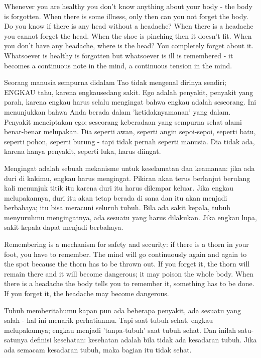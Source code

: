 \english
Whenever you are healthy you don't know anything about your body - the body is forgotten. When there is some illness, only then can you not forget the body. Do you know if there is any head without a headache? When there is a headache you cannot forget the head. When the shoe is pinching then it doesn’t fit. When you don’t have any headache, where is the head? You completely forget about it. Whatsoever is healthy is forgotten but whatsoever is ill is remembered - it becomes a continuous note in the mind, a continuous tension in the mind.

\bahasa
Seorang manusia sempurna didalam Tao tidak mengenal dirinya sendiri; ENGKAU tahu, karena engkausedang sakit. Ego adalah penyakit, penyakit yang parah, karena engkau harus selalu mengingat bahwa engkau adalah seseorang. Ini menunjukkan bahwa Anda berada dalam 'ketidaknyamanan' yang dalam. Penyakit menciptakan ego; seseorang keberadaan yang sempurna sehat alami benar-benar melupakan. Dia seperti awan, seperti angin sepoi-sepoi, seperti batu, seperti pohon, seperti burung - tapi tidak pernah seperti manusia. Dia tidak ada, karena hanya penyakit, seperti luka, harus diingat.

\bahasa
Mengingat adalah sebuah mekanisme untuk keselamatan dan keamanan: jika ada duri di kakimu, engkau harus mengingat. Pikiran akan terus berlanjut berulang kali menunjuk titik itu karena duri itu harus dilempar keluar. Jika engkau melupakannya, duri itu akan tetap berada di sana dan itu akan menjadi berbahaya; itu bisa meracuni seluruh tubuh. Bila ada sakit kepala, tubuh menyuruhmu mengingatnya, ada sesuatu yang harus dilakukan. Jika engkau lupa, sakit kepala dapat menjadi berbahaya.

\english
Remembering is a mechanism for safety and security: if there is a thorn in your foot, you have to remember. The mind will go continuously again and again to the spot because the thorn has to be thrown out. If you forget it, the thorn will remain there and it will become dangerous; it may poison the whole body. When there is a headache the body tells you to remember it, something has to be done. If you forget it, the headache may become dangerous.

\bahasa
Tubuh memberitahumu kapan pun ada beberapa penyakit, ada sesuatu yang salah - hal ini menarik perhatianmu. Tapi saat tubuh sehat, engkau melupakannya; engkau menjadi 'tanpa-tubuh' saat tubuh sehat. Dan inilah satu-satunya definisi kesehatan: kesehatan adalah bila tidak ada kesadaran tubuh. Jika ada semacam kesadaran tubuh, maka bagian itu tidak sehat.

